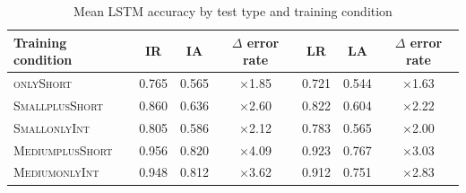 \documentclass[twoside,11pt]{article}
\newcommand{\tscx}[1]{\textsc{#1}\xspace}
\newcommand{\sm}{\tscx{Small}}
\newcommand{\med}{\tscx{Medium}}
\newcommand{\origRand}{IR\xspace}
\newcommand{\longRand}{LR\xspace}
\newcommand{\origAdv}{IA\xspace}
\newcommand{\longAdv}{LA\xspace}
\newcommand{\onlyShort}{\tscx{onlyShort}}
\newcommand{\plusShort}{\tscx{plusShort}}
\newcommand{\onlyInt}{\tscx{onlyInt}}
\begin{document}

\begin{table}[h!]
	\centering
	\begin{tabular}{lcccccc}
		\toprule
		Training condition & \origRand & \origAdv & $\Delta$ error rate & \longRand & \longAdv & $\Delta$ error rate \\
		\midrule                                                
		\onlyShort         & 0.765    & 0.565    & $\times$1.85   & 0.721    & 0.544    & $\times$1.63   \\
		\sm \plusShort     & 0.860    & 0.636    & $\times$2.60   & 0.822    & 0.604    & $\times$2.22   \\
		\sm \onlyInt       & 0.805    & 0.586    & $\times$2.12   & 0.783    & 0.565    & $\times$2.00   \\
		\med \plusShort    & 0.956    & 0.820    & $\times$4.09   & 0.923    & 0.767    & $\times$3.03   \\
		\med \onlyInt      & 0.948    & 0.812    & $\times$3.62   & 0.912    & 0.751    & $\times$2.83   \\
		\bottomrule
	\end{tabular}
	\caption{Mean LSTM accuracy by test type and training condition}
	\label{tab:lstm-acc-test-set-by-train}
\end{table}
\end{document}
